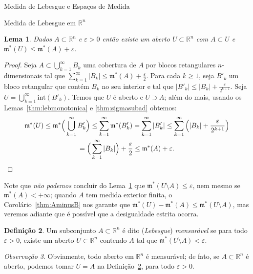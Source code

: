 \documentclass[oneside,final,11pt]{amsbook}
\newcommand{\R}{\mathds R}
\newcommand{\leb}{\mathfrak m}
\newcommand{\Int}{\mathrm{int}}
\theoremstyle{remark}\newtheorem{exercise}{Exercício}[chapter]
\theoremstyle{remark}\newtheorem{*exercise}[exercise]{\hbox to 0pt{\hskip 0pt minus 1fil*}Exercício}
\theoremstyle{definition}\newtheorem{exdefin}{Definição}[chapter]
\theoremstyle{plain}\newtheorem{teo}{Teorema}[section]
\theoremstyle{plain}\newtheorem{lem}[teo]{Lema}
\theoremstyle{plain}\newtheorem{prop}[teo]{Proposição}
\theoremstyle{plain}\newtheorem{cor}[teo]{Corolário}
\theoremstyle{definition}\newtheorem{defin}[teo]{Definição}
\theoremstyle{remark}\newtheorem{rem}[teo]{Observação}
\theoremstyle{definition}\newtheorem{notation}[teo]{Notação}
\theoremstyle{definition}\newtheorem{convention}[teo]{Convenção}
\theoremstyle{definition}\newtheorem{example}[teo]{Exemplo}
\numberwithin{section}{chapter}
\numberwithin{equation}{section}
\begin{document}
\begin{chapter}{Medida de Lebesgue e Espaços de Medida}
\begin{section}[Medida de Lebesgue em $\R^n$]{Medida de Lebesgue em ${\R^n}$}
\begin{lem}\label{thm:aproxaberto}
Dados $A\subset\R^n$ e $\varepsilon>0$ então existe um aberto $U\subset\R^n$ com $A\subset U$
e $\leb^*(U)\le\leb^*(A)+\varepsilon$.
\end{lem}
\begin{proof}
Seja $A\subset\bigcup_{k=1}^\infty B_k$ uma cobertura de $A$ por blocos retangulares $n$-dimensionais
tal que $\sum_{k=1}^\infty\vert B_k\vert\le\leb^*(A)+\frac\varepsilon2$. Para cada $k\ge1$, seja
$B'_k$ um bloco retangular que contém $B_k$ no seu interior e tal que $\vert B'_k\vert\le\vert B_k\vert+\frac\varepsilon{2^{k+1}}$.
Seja $U=\bigcup_{k=1}^\infty\Int(B'_k)$. Temos que $U$ é aberto e $U\supset A$; além do mais,
usando os Lemas~\ref{thm:lebmonotonica} e \ref{thm:sigmasubad} obtemos:
\begin{multline*}\leb^*(U)\le\leb^*\Big(\bigcup_{k=1}^\infty B'_k\Big)\le\sum_{k=1}^\infty\leb^*(B'_k)=
\sum_{k=1}^\infty\vert B'_k\vert\le\sum_{k=1}^\infty\Big(\vert B_k\vert+\frac\varepsilon{2^{k+1}}\Big)\\
=\Big(\sum_{k=1}^\infty\vert B_k\vert\Big)+\frac\varepsilon2\le\leb^*(A)+\varepsilon.\qedhere
\end{multline*}
\end{proof}

Note que {\em não podemos\/} concluir do Lema~\ref{thm:aproxaberto} que $\leb^*(U\setminus A)\le\varepsilon$,
nem mesmo se $\leb^*(A)<+\infty$; quando $A$ tem medida exterior finita, o Corolário~\ref{thm:AminusB} nos garante que
$\leb^*(U)-\leb^*(A)\le\leb^*(U\setminus A)$, mas veremos adiante que é possível que a desigualdade estrita ocorra.
\begin{defin}\label{thm:defmens}
Um subconjunto $A\subset\R^n$ é dito ({\em Lebesgue}) {\em mensurável\/}
 se para todo $\varepsilon>0$, existe um aberto $U\subset\R^n$
contendo $A$ tal que $\leb^*(U\setminus A)<\varepsilon$.
\end{defin}

\begin{rem}\label{thm:abertomens}
Obviamente, todo aberto em $\R^n$ é mensurável; de fato, se $A\subset\R^n$ é aberto, podemos tomar $U=A$ na Definição~\ref{thm:defmens},
para todo $\varepsilon>0$.
\end{rem}


\end{section}
\end{chapter}
\end{document}
